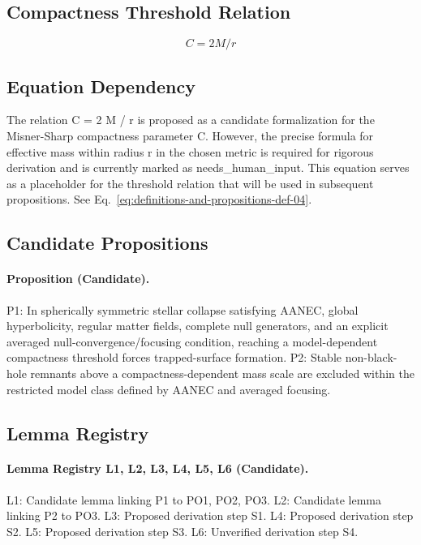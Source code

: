 \documentclass[conference]{IEEEtran}
\begin{document}
\subsection{Compactness Threshold Relation}
\begin{equation}
C = 2 M / r
\label{eq:definitions-and-propositions-def-04}
\end{equation}

\subsection{Equation Dependency}
The relation C = 2 M / r is proposed as a candidate formalization for the Misner-Sharp compactness parameter C. However, the precise formula for effective mass within radius r in the chosen metric is required for rigorous derivation and is currently marked as needs\_human\_input. This equation serves as a placeholder for the threshold relation that will be used in subsequent propositions. See Eq.~\eqref{eq:definitions-and-propositions-def-04}.

\subsection{Candidate Propositions}
\paragraph{Proposition (Candidate).} P1: In spherically symmetric stellar collapse satisfying AANEC, global hyperbolicity, regular matter fields, complete null generators, and an explicit averaged null-convergence/focusing condition, reaching a model-dependent compactness threshold forces trapped-surface formation. P2: Stable non-black-hole remnants above a compactness-dependent mass scale are excluded within the restricted model class defined by AANEC and averaged focusing.

\subsection{Lemma Registry}
\paragraph{Lemma Registry L1, L2, L3, L4, L5, L6 (Candidate).} L1: Candidate lemma linking P1 to PO1, PO2, PO3. L2: Candidate lemma linking P2 to PO3. L3: Proposed derivation step S1. L4: Proposed derivation step S2. L5: Proposed derivation step S3. L6: Unverified derivation step S4.
\end{document}
